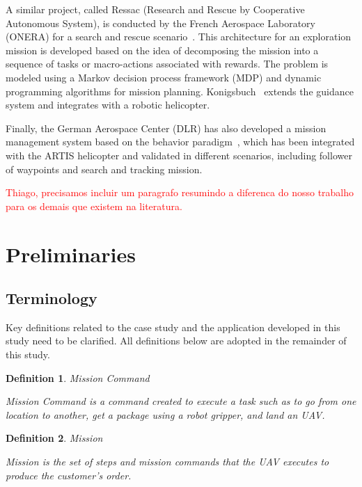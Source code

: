 \documentclass[conference,harvard,brazil,english]{sbatex}
\newtheorem{myDefinition}{Definition}
\begin{document}
A similar project, called Ressac (Research and Rescue by Cooperative Autonomous System), is conducted by the French Aerospace Laboratory (ONERA) for a search and rescue scenario~\cite{fabiani2007autonomous}. This architecture for an exploration mission is developed based on the idea of decomposing the mission into a sequence of tasks or macro-actions associated with rewards. The problem is modeled using a Markov decision process framework (MDP) and dynamic programming algorithms for mission planning. Konigsbuch~\cite{teichteil2007multi} extends the guidance system and integrates with a robotic helicopter.

Finally, the German Aerospace Center (DLR) has also developed a mission management system based on the behavior paradigm~\cite{adolf2010onboard}, which has been integrated with the ARTIS helicopter and validated in different scenarios, including follower of waypoints and search and tracking mission.

\textcolor{red}{Thiago, precisamos incluir um paragrafo resumindo a diferenca do nosso trabalho para os demais que existem na literatura.}

\section{Preliminaries}
\label{sec:background}

\subsection{Terminology}
\label{sec:terms}

Key definitions related to the case study and the application developed in this study need to be clarified. All definitions below are adopted in the remainder of this study.

\begin{myDefinition} {Mission Command} 

Mission Command is a command created to execute a task such as to go from one location to another, get a package using a robot gripper, and land an UAV.
\label{def:missioncommand}
\end{myDefinition}

\begin{myDefinition}{Mission} 

Mission is the set of steps and mission commands that the UAV executes to produce the customer's order.
\label{def:mission}
\end{myDefinition}
\end{document}
